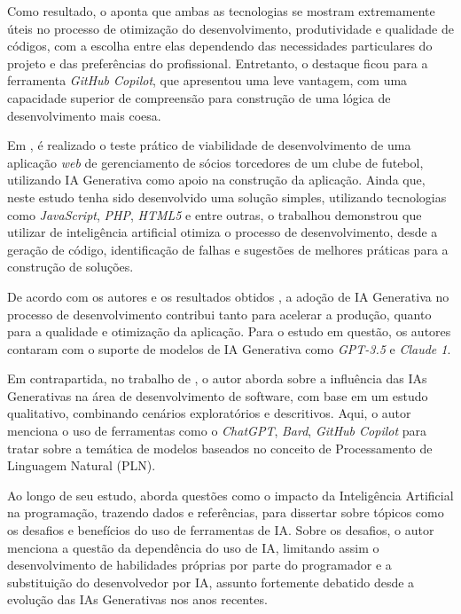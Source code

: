 \documentclass[english,brazilian]{UNISINOSartigo} %
\begin{document}
Como resultado, o  aponta que ambas as tecnologias se mostram extremamente úteis no processo de otimização do desenvolvimento, produtividade e qualidade de códigos, com a escolha entre elas dependendo das necessidades particulares do projeto e das preferências do profissional. Entretanto, o destaque ficou para a ferramenta \textit{GitHub Copilot}, que apresentou uma leve vantagem, com uma capacidade superior de compreensão para construção de uma lógica de desenvolvimento mais coesa.

Em , é realizado o teste prático de viabilidade de desenvolvimento de uma aplicação \textit{web} de gerenciamento de sócios torcedores de um clube de futebol, utilizando IA Generativa como apoio na construção da aplicação. Ainda que, neste estudo tenha sido desenvolvido uma solução simples, utilizando tecnologias como \textit{JavaScript}, \textit{PHP}, \textit{HTML5} e entre outras, o trabalhou demonstrou que utilizar de inteligência artificial otimiza o processo de desenvolvimento, desde a geração de código, identificação de falhas e sugestões de melhores práticas para a construção de soluções.

De acordo com os autores e os resultados obtidos \cite{daSilva2025}, a adoção de IA Generativa no processo de desenvolvimento contribui tanto para acelerar a produção, quanto para a qualidade e otimização da aplicação. Para o estudo em questão, os autores contaram com o suporte de modelos de IA Generativa como \textit{GPT-3.5} e \textit{Claude 1}.

Em contrapartida, no trabalho de , o autor aborda sobre a influência das IAs Generativas na área de desenvolvimento de software, com base em um estudo qualitativo, combinando cenários exploratórios e descritivos. Aqui, o autor menciona o uso de ferramentas como o \textit{ChatGPT}, \textit{Bard}, \textit{GitHub Copilot} para tratar sobre a temática de modelos baseados no conceito de Processamento de Linguagem Natural (PLN).

Ao longo de seu estudo,  aborda questões como o impacto da Inteligência Artificial na programação, trazendo dados e referências, para dissertar sobre tópicos como os desafios e benefícios do uso de ferramentas de IA. Sobre os desafios, o autor menciona a questão da dependência do uso de IA, limitando assim o desenvolvimento de habilidades próprias por parte do programador e a substituição do desenvolvedor por IA, assunto fortemente debatido desde a evolução das IAs Generativas nos anos recentes. 
\end{document}
